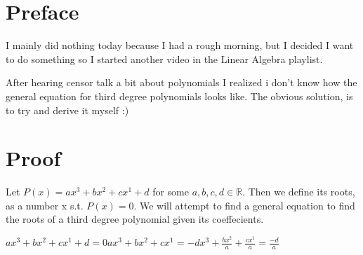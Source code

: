 \documentclass{article}
\begin{document}
\section{Preface}

I mainly did nothing today because I had a rough morning, but I decided I want to do something so I started another video in the Linear Algebra playlist.

After hearing censor talk a bit about polynomials I realized i don't know how the general equation for third degree polynomials looks like. The obvious solution, is to try and derive it myself :)


\section{Proof}

Let $P(x) = ax^3 + bx^2 + cx^1 +d $ for some $a,b,c,d\in\mathbb R$. Then we define its roots, as a number x s.t. $P(x) =0$. We will attempt to find a general equation to find the roots of a third degree polynomial given its coeffecients.

$
ax^3 + bx^2 + cx^1 +d  = 0

ax^3 + bx^2 + cx^1 = -d

x^3 + \frac{bx^2} a + \frac{cx^1} a = \frac{-d} a
$
\end{document}
